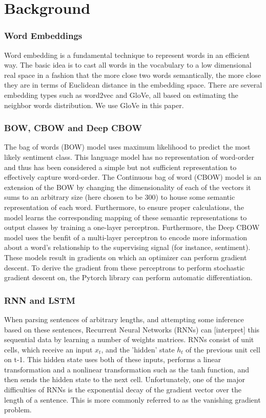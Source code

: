 \section{Background}
\label{sec: background}

\subsubsection{Word Embeddings}
Word embedding is a fundamental technique to represent words in an efficient
way. The basic idea is to cast all words in the vocabulary to a low dimensional
real space in a fashion that the more close two words semantically, the more
close they are in terms of Euclidean distance in the embedding space. There are
several embedding types such as word2vec\cite{mikolov2013distributed} and
GloVe\cite{pennington2014glove}, all based on estimating the neighbor words
distribution. We use GloVe in this paper.
 

\subsubsection{BOW, CBOW and Deep CBOW}
The bag of words (BOW) model uses maximum likelihood to predict the most likely
sentiment class. This language model has no representation of word-order and
thus has been considered a simple but not sufficient representation to
effectively capture word-order. The Continuous bag of word (CBOW)
model\cite{DBLP:journals/corr/abs-1301-3781} is an extension of the BOW by
changing the dimensionality of each of the vectors it sums to an arbitrary size
(here chosen to be 300) to house some semantic representation of each word.
Furthermore, to ensure proper calculations, the model learns the corresponding
mapping of these semantic representations to output classes by training a
one-layer perceptron. Furthermore, the Deep CBOW model uses the benfit of a
multi-layer perceptron to encode more information about a word's relationship to
the supervising signal (for instance, sentiment). These models result in
gradients on which an optimizer can perform gradient descent. To derive the
gradient from these perceptrons to perform stochastic gradient descent on, the
Pytorch library can perform automatic differentiation\cite{paszke2017automatic}.

\subsubsection{RNN and LSTM}
When parsing sentences of arbitrary lengths, and attempting some inference based
on these sentences, Recurrent Neural Networks (RNNs) can [interpret] this
sequential data by learning a number of weights matrices. RNNs consist of unit
cells, which receive an input $x_t$, and the 'hidden' state $h_t$ of the
previous unit cell on t-1. This hidden state uses both of these inputs, performs
a linear transformation and a nonlinear transformation such as the tanh
function, and then sends the hidden state to the next cell. Unfortunately, one of
the major difficulties of RNNs is the exponential decay of the gradient vector
over the length of a sentence\cite{bengio1994learning}. This is more commonly
referred to as the vanishing gradient problem.

